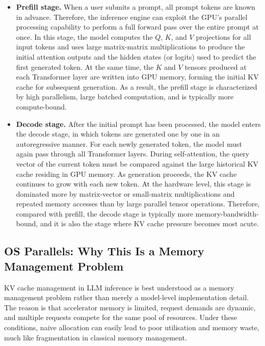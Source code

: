 \documentclass[10pt, a4paper]{article}
\begin{document}
\begin{itemize}
    \item \textbf{Prefill stage.}
    When a user submits a prompt, all prompt tokens are known in advance.
    Therefore, the inference engine can exploit the GPU's parallel processing
    capability to perform a full forward pass over the entire prompt at once.
    In this stage, the model computes the $Q$, $K$, and $V$ projections for
    all input tokens and uses large matrix-matrix multiplications to produce
    the initial attention outputs and the hidden states (or logits) used to
    predict the first generated token. At the same time, the $K$ and $V$
    tensors produced at each Transformer layer are written into GPU memory,
    forming the initial KV cache for subsequent generation. As a result, the
    prefill stage is characterized by high parallelism, large batched
    computation, and is typically more compute-bound.

    \item \textbf{Decode stage.}
    After the initial prompt has been processed, the model enters the decode
    stage, in which tokens are generated one by one in an autoregressive
    manner. For each newly generated token, the model must again pass through
    all Transformer layers. During self-attention, the query vector of the
    current token must be compared against the large historical KV cache
    residing in GPU memory. As generation proceeds, the KV cache continues to
    grow with each new token. At the hardware level, this stage is dominated
    more by matrix-vector or small-matrix multiplications and repeated memory
    accesses than by large parallel tensor operations. Therefore, compared with
    prefill, the decode stage is typically more memory-bandwidth-bound, and it
    is also the stage where KV cache pressure becomes most acute.\cite{kwon2023vllm,sheng2023flexgen}
\end{itemize}

\subsection{OS Parallels: Why This Is a Memory Management Problem}


    KV cache management in LLM inference is best understood as a memory management
    problem rather than merely a model-level implementation detail. The reason is
    that accelerator memory is limited, request demands are dynamic, and multiple
    requests compete for the same pool of resources. Under these conditions, naive
    allocation can easily lead to poor utilisation and memory waste, much like
    fragmentation in classical memory management.
\end{document}
